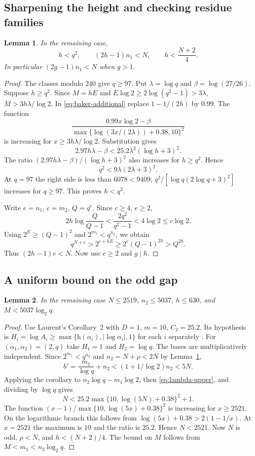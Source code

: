 \documentclass[11pt]{article}
\newtheorem{lemma}{Lemma}
\begin{document}
\subsection{Sharpening the height and checking residue families}
\begin{lemma}\label{lem:sharp-h}
In the remaining case,
\[
h<q^2,\qquad (2h-1)n_1<N,\qquad
h<\frac{N+2}{4}.
\]
In particular $(2g-1)n_1<N$ when $g>1$.
\end{lemma}
\begin{proof}
The classes modulo $240$ give $q\ge97$. Put $\lambda=\log q$ and
$\beta=\log(27/26)$. Suppose $h\ge q^2$.
Since $M=hE$ and $E\log2\ge2\log(q^2-1)>3\lambda$,
$M>3h\lambda/\log2$.
In \eqref{eq:baker-additional} replace $1-1/(2h)$ by $0.99$.
The function
\[
\frac{0.99x\log2-\beta}
 {\max\{\log(3x/(2\lambda))+0.38,10\}^2}
\]
is increasing for $x\ge3h\lambda/\log2$. Substitution gives
\[
2.97h\lambda-\beta
 <25.2\lambda^2(\log h+3)^2.
\]
The ratio $(2.97h\lambda-\beta)/(\log h+3)^2$ also increases
for $h\ge q^2$. Hence
\[
q^2<9\lambda(2\lambda+3)^2.
\]
At $q=97$ the right side is less than $6078<9409$;
$q^2/[\log q(2\log q+3)^2]$ increases for $q\ge97$.
This proves $h<q^2$.

Write $e=n_1$, $c=m_2$, $Q=q^e$. Since $c\ge4$, $e\ge2$,
\[
2h\log\frac{Q}{Q-1}
 <\frac{2q^2}{q^2-1}<4\log2\le c\log2.
\]
Using $2^E\ge(Q-1)^2$ and $2^{m_1}<q^{n_2}$, we obtain
\[
q^{N+e}>2^{c+hE}\ge2^c(Q-1)^{2h}>Q^{2h}.
\]
Thus $(2h-1)e<N$. Now use $e\ge2$ and $g\mid h$.
\end{proof}

\subsection{A uniform bound on the odd gap}
\begin{lemma}\label{lem:uniform-N}
In the remaining case $N\le2519$, $n_2\le5037$, $h\le630$, and
$M<5037\log_2 q$.
\end{lemma}
\begin{proof}
Use Laurent's Corollary~2 with $D=1$, $m=10$, $C_2=25.2$.
Its hypothesis is
$H_i=\log A_i\ge\max\{\mathrm h(\alpha_i),|\log\alpha_i|,1\}$
for each $i$ separately \cite[p.~328]{Laurent}. For
$(\alpha_1,\alpha_2)=(2,q)$ take $H_1=1$ and $H_2=\log q$.
The bases are multiplicatively independent. Since
$2^{m_1}<q^{n_2}$ and $n_2=N+\rho<2N$ by Lemma~\ref{lem:sharp-h},
\[
 b'=\frac{m_1}{\log q}+n_2
 <(1+1/\log2)n_2<5N.
\]
Applying the corollary to $n_2\log q-m_1\log2$, then
\eqref{eq:lambda-upper}, and dividing by $\log q$ gives
\[
 N <25.2\max\{10,\log(5N)+0.38\}^2+1.
\]
The function $(x-1)/\max\{10,\log(5x)+0.38\}^2$ is increasing
for $x\ge2521$. On the logarithmic branch this follows from
$\log(5x)+0.38>2(1-1/x)$. At $x=2521$ the maximum is $10$
and the ratio is $25.2$. Hence $N<2521$. Now $N$ is odd,
$\rho<N$, and $h<(N+2)/4$. The bound on $M$ follows from
$M<m_1<n_2\log_2q$.
\end{proof}
\end{document}
